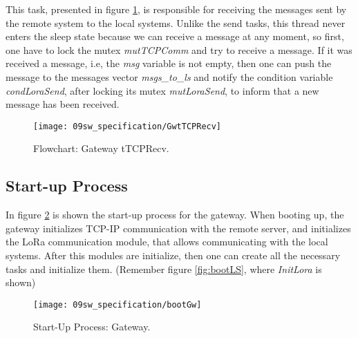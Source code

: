 \clearpage
%
%
%

This task, presented in figure \ref{fig:gwtTCPRecv}, is responsible for receiving the messages sent by the remote system to the local systems. Unlike the send tasks, this thread never enters the sleep state because we can receive a message at any moment, so first, one have to lock the mutex \textit{mutTCPComm} and try to receive a message. If it was received a message, i.e, the \textit{msg} variable is not empty, then one can push the message to the messages vector \textit{msgs\_to\_ls} and notify the condition variable \textit{condLoraSend}, after locking its mutex \textit{mutLoraSend}, to inform that a new message has been received.

\begin{figure}[H]
	\centering
	\texttt{[image: 09sw\_specification/GwtTCPRecv]}
	\caption{Flowchart: Gateway tTCPRecv.}
	\label{fig:gwtTCPRecv}
\end{figure}

\subsection{Start-up Process}
In figure \ref{fig:bootGateway} is shown the start-up process for the gateway. When booting up, the gateway initializes TCP-IP communication with the remote server, and initializes the LoRa communication module, that allows communicating with the local systems. After this modules are initialize, then one can create all the necessary tasks and initialize them. (Remember figure \ref{fig:bootLS}, where \textit{InitLora} is shown)

\begin{figure}[H]
	\centering
	\texttt{[image: 09sw\_specification/bootGw]}
	\caption{Start-Up Process: Gateway.}
	\label{fig:bootGateway}
\end{figure}

